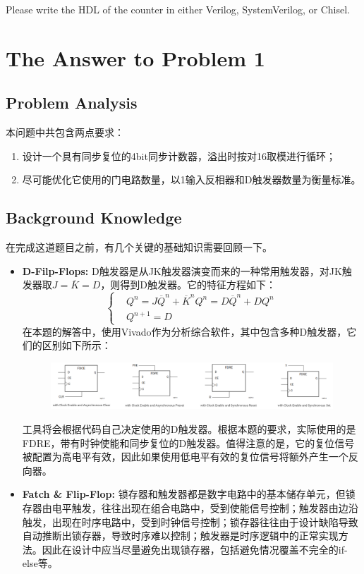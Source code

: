 \documentclass[11pt, a4 paper]{article}
\begin{document}
Please write the HDL of the counter in either Verilog, SystemVerilog, or Chisel. 

\section{The Answer to Problem 1}
\subsection{Problem Analysis}
本问题中共包含两点要求：
\begin{enumerate}[nosep]
    \item 设计一个具有同步复位的4bit同步计数器，溢出时按对16取模进行循环；
    \item 尽可能优化它使用的门电路数量，以1输入反相器和D触发器数量为衡量标准。
\end{enumerate}
\subsection{Background Knowledge}
在完成这道题目之前，有几个关键的基础知识需要回顾一下。
\begin{itemize}
    \item \textbf{D-Filp-Flops:} D触发器是从JK触发器演变而来的一种常用触发器，对JK触发器取$J=\overline{K}=D$，则得到D触发器。它的特征方程如下：
    $$\begin{cases}&Q^n=J\overline{Q}^n+\overline{K}^nQ^n=D\overline{Q}^n+DQ^n\\&Q^{n+1}=D\end{cases}$$
    在本题的解答中，使用Vivado作为分析综合软件，其中包含多种D触发器，它们的区别如下所示：
    
    \begin{figure}[h]
    \centering
    \includegraphics[width=1\linewidth]{image/Xilinx_D_Filp_Flop.png}
    \end{figure}
    工具将会根据代码自己决定使用的D触发器。根据本题的要求，实际使用的是FDRE，带有时钟使能和同步复位的D触发器。值得注意的是，它的复位信号被配置为高电平有效，因此如果使用低电平有效的复位信号将额外产生一个反向器。
    \item \textbf{Fatch \& Flip-Flop:} 锁存器和触发器都是数字电路中的基本储存单元，但锁存器由电平触发，往往出现在组合电路中，受到使能信号控制；触发器由边沿触发，出现在时序电路中，受到时钟信号控制；锁存器往往由于设计缺陷导致自动推断出锁存器，导致时序难以控制；触发器是时序逻辑中的正常实现方法。因此在设计中应当尽量避免出现锁存器，包括避免情况覆盖不完全的if-else等。
\end{itemize}
\end{document}
